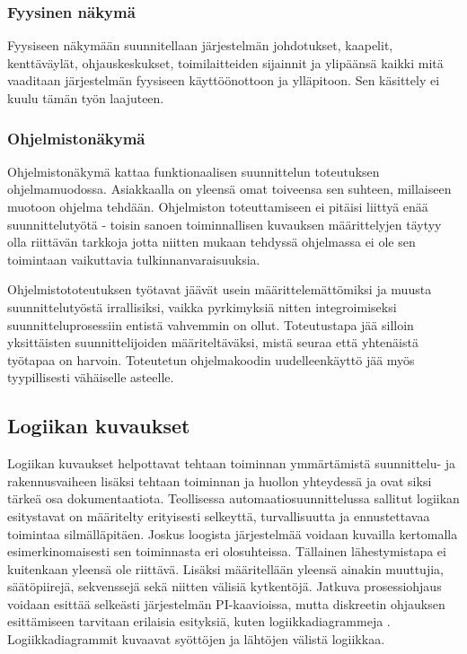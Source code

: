 \documentclass[finnish,12pt]{article}
\begin{document}
		\subsubsection{Fyysinen näkymä}

Fyysiseen näkymään suunnitellaan järjestelmän johdotukset, kaapelit, kenttäväylät,
ohjauskeskukset, toimilaitteiden sijainnit ja ylipäänsä kaikki mitä vaaditaan 
järjestelmän fyysiseen käyttöönottoon ja ylläpitoon. Sen käsittely ei kuulu tämän työn laajuteen.

		\subsubsection{Ohjelmistonäkymä}

Ohjelmistonäkymä kattaa funktionaalisen suunnittelun toteutuksen ohjelmamuodossa.
Asiakkaalla on yleensä omat toiveensa sen suhteen, millaiseen muotoon ohjelma tehdään.
Ohjelmiston toteuttamiseen ei pitäisi liittyä enää suunnittelutyötä - toisin sanoen toiminnallisen kuvauksen määrittelyjen täytyy olla riittävän tarkkoja jotta niitten mukaan tehdyssä ohjelmassa ei ole sen toimintaan vaikuttavia tulkinnanvaraisuuksia.

Ohjelmistototeutuksen työtavat jäävät usein määrittelemättömiksi ja muusta suunnittelutyöstä irrallisiksi,
vaikka pyrkimyksiä nitten integroimiseksi suunnitteluprosessiin entistä vahvemmin on ollut.
Toteutustapa jää silloin yksittäisten suunnittelijoiden määriteltäväksi, mistä seuraa että yhtenäistä työtapaa on harvoin.
Toteutetun ohjelmakoodin uudelleenkäyttö jää myös tyypillisesti vähäiselle asteelle. \cite{RefWorks:42}


	\subsection{Logiikan kuvaukset}

Logiikan kuvaukset helpottavat tehtaan toiminnan ymmärtämistä suunnittelu- ja rakennusvaiheen lisäksi tehtaan toiminnan ja huollon yhteydessä ja ovat siksi tärkeä osa dokumentaatiota.
Teollisessa automaatiosuunnittelussa sallitut logiikan esitystavat on määritelty erityisesti selkeyttä, turvallisuutta ja ennustettavaa toimintaa silmälläpitäen.
Joskus loogista järjestelmää voidaan kuvailla kertomalla esimerkinomaisesti sen toiminnasta eri olosuhteissa.
Tällainen lähestymistapa ei kuitenkaan yleensä ole riittävä.
Lisäksi määritellään yleensä ainakin muuttujia, säätöpiirejä, sekvenssejä sekä niitten välisiä kytkentöjä.\cite{RefWorks:41}
Jatkuva prosessiohjaus voidaan esittää selkeästi järjestelmän PI-kaavioissa, mutta diskreetin ohjauksen esittämiseen tarvitaan erilaisia esityksiä, kuten logiikkadiagrammeja \cite{RefWorks:54}. 
Logiikkadiagrammit kuvaavat syöttöjen ja lähtöjen välistä logiikkaa.
\end{document}
